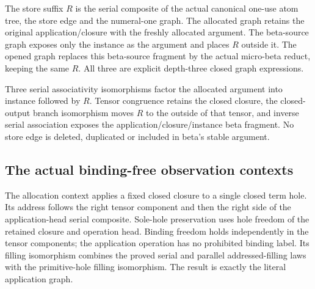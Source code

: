 


The store suffix $R$ is the serial composite of the actual canonical
one-use atom tree, the store edge and the numeral-one graph. The allocated
graph retains the original application/closure with the freshly allocated
argument. The beta-source graph exposes only the instance as the argument
and places $R$ outside it. The opened graph replaces this beta-source fragment
by the actual micro-beta reduct, keeping the same $R$. All three are explicit
depth-three closed graph expressions.





Three serial associativity isomorphisms factor the allocated argument into
instance followed by $R$. Tensor congruence retains the closed closure, the
closed-output branch isomorphism moves $R$ to the outside of that tensor,
and inverse serial association exposes the application/closure/instance
beta fragment. No store edge is deleted, duplicated or included in beta's
stable argument.



\subsection{The actual binding-free observation contexts}

The allocation context applies a fixed closed closure to a single closed
term hole. Its address follows the right tensor component and then the
right side of the application-head serial composite. Sole-hole preservation
uses hole freedom of the retained closure and operation head. Binding freedom
holds independently in the tensor components; the application operation has
no prohibited binding label. Its filling isomorphism combines the proved
serial and parallel addressed-filling laws with the primitive-hole filling
isomorphism. The result is exactly the literal application graph.

